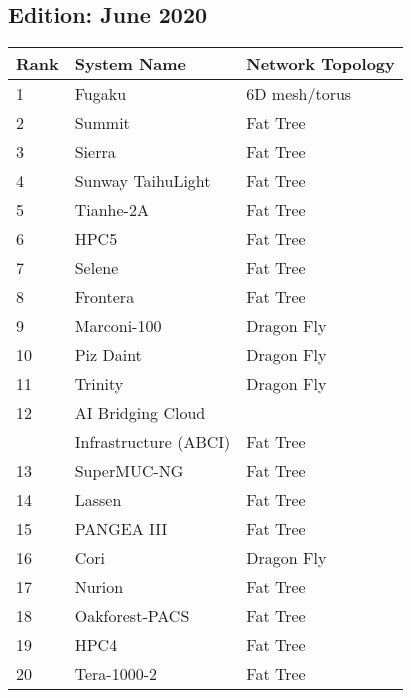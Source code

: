 \documentclass{article}
\begin{document}
\vfill
\begin{minipage}{0.45\textwidth}
\subsection{Edition: June 2020}
\label{sec:edition:-june-2020}
\begin{tabular}[H]{||l|l|l||} \hline\hline
  Rank & System Name           & Network Topology \\ \hline\hline
  1    & Fugaku                & 6D mesh/torus    \\ \hline
  2    & Summit                & Fat Tree         \\ \hline
  3    & Sierra                & Fat Tree         \\ \hline
  4    & Sunway TaihuLight     & Fat Tree         \\ \hline
  5    & Tianhe-2A             & Fat Tree         \\ \hline
  6    & HPC5                  & Fat Tree         \\ \hline
  7    & Selene                & Fat Tree         \\ \hline
  8    & Frontera              & Fat Tree         \\ \hline
  9    & Marconi-100           & Dragon Fly       \\ \hline
  10   & Piz Daint             & Dragon Fly       \\ \hline
  11   & Trinity               & Dragon Fly       \\ \hline
  12   & AI Bridging Cloud     &                  \\
       & Infrastructure (ABCI) & Fat Tree         \\ \hline
  13   & SuperMUC-NG           & Fat Tree         \\ \hline
  14   & Lassen                & Fat Tree         \\ \hline
  15   & PANGEA III            & Fat Tree         \\ \hline
  16   & Cori                  & Dragon Fly       \\ \hline
  17   & Nurion                & Fat Tree         \\ \hline
  18   & Oakforest-PACS        & Fat Tree         \\ \hline
  19   & HPC4                  & Fat Tree         \\ \hline
  20   & Tera-1000-2           & Fat Tree         \\ \hline\hline
\end{tabular}
\end{minipage}
\end{document}
